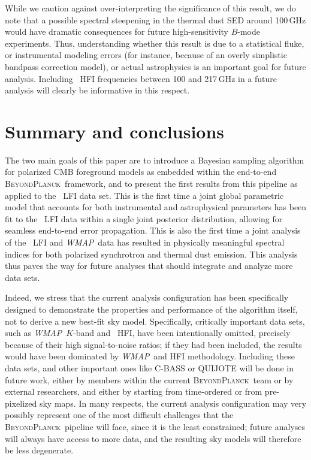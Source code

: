\documentclass[twocolumn]{aa}
\def\WMAP{\textit{WMAP}}
\newcommand{\BP}{\textsc{BeyondPlanck}}
\newcommand{\?}[1]{\textcolor{red}{{\bf [#1]}}}
\begin{document}
While we caution against over-interpreting the significance of this
result, we do note that a possible spectral steepening in the thermal
dust SED around 100\,GHz would have dramatic consequences for future
high-sensitivity $B$-mode experiments. Thus, understanding whether
this result is due to a statistical fluke, or instrumental modeling
errors (for instance, because of an overly simplistic bandpass correction
model), or actual astrophysics is an important goal for future
analysis. Including \Planck\ HFI frequencies between 100 and 217\,GHz
in a future analysis will clearly be informative in this respect.


\section{Summary and conclusions}  
\label{sec:conclusions}

The two main goals of this paper are to introduce a Bayesian sampling
algorithm for polarized CMB foreground models as embedded within the
end-to-end \BP\ framework, and to present the first results from this
pipeline as applied to the \Planck\ LFI data set. This is the first
time a joint global parametric model that accounts for both
instrumental and astrophysical parameters has been fit to the
\Planck\ LFI data within a single joint posterior distribution,
allowing for seamless end-to-end error propagation. This is also the
first time a joint analysis of the \Planck\ LFI and \WMAP\ data
has resulted in physically meaningful spectral indices for both polarized
synchrotron and thermal dust emission. This analysis thus paves the
way for future analyses that should integrate and analyze more data
sets.

Indeed, we stress that the current analysis configuration has been
specifically designed to demonstrate the properties and performance of
the algorithm itself, not to derive a new best-fit sky
model. Specifically, critically important data sets, such as
\WMAP\ $K$-band and \Planck\ HFI, have been intentionally omitted,
precisely because of their high signal-to-noise ratios; if they had
been included, the results would have been dominated by \WMAP\ and HFI
methodology. Including these data sets, and other important ones like
C-BASS \citep{jew2019} or QUIJOTE \citep{QUIJOTE_I_2015} will be done
in future work, either by members within the current \BP\ team or by
external researchers, and either by starting from time-ordered or from
pre-pixelized sky maps. In many respects, the current analysis
configuration may very possibly represent one of the most difficult
challenges that the \BP\ pipeline will face, since it is
the least constrained; future analyses will always have access to more
data, and the resulting sky models will therefore be less degenerate.
\end{document}
